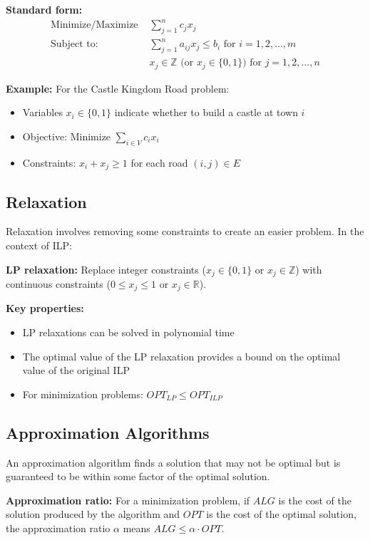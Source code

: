 \textbf{Standard form:}
\begin{align}
\text{Minimize/Maximize } & \sum_{j=1}^{n} c_j x_j \\
\text{Subject to: } & \sum_{j=1}^{n} a_{ij} x_j \leq b_i \text{ for } i = 1, 2, \ldots, m \\
& x_j \in \mathbb{Z} \text{ (or } x_j \in \{0,1\}\text{) for } j = 1, 2, \ldots, n
\end{align}

\textbf{Example:} For the Castle Kingdom Road problem:
\begin{itemize}
    \item Variables $x_i \in \{0,1\}$ indicate whether to build a castle at town $i$
    \item Objective: Minimize $\sum_{i \in V} c_i x_i$
    \item Constraints: $x_i + x_j \geq 1$ for each road $(i,j) \in E$
\end{itemize}

\subsection{Relaxation}
Relaxation involves removing some constraints to create an easier problem. In the context of ILP:

\textbf{LP relaxation:} Replace integer constraints ($x_j \in \{0,1\}$ or $x_j \in \mathbb{Z}$) with continuous constraints ($0 \leq x_j \leq 1$ or $x_j \in \mathbb{R}$).

\textbf{Key properties:}
\begin{itemize}
    \item LP relaxations can be solved in polynomial time
    \item The optimal value of the LP relaxation provides a bound on the optimal value of the original ILP
    \item For minimization problems: $OPT_{LP} \leq OPT_{ILP}$
\end{itemize}

\subsection{Approximation Algorithms}
An approximation algorithm finds a solution that may not be optimal but is guaranteed to be within some factor of the optimal solution.

\textbf{Approximation ratio:} For a minimization problem, if $ALG$ is the cost of the solution produced by the algorithm and $OPT$ is the cost of the optimal solution, the approximation ratio $\alpha$ means $ALG \leq \alpha \cdot OPT$.

